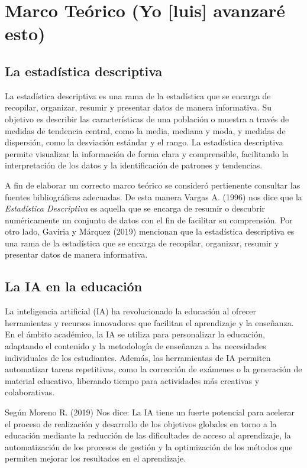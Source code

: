 \section{Marco Teórico (Yo [luis] avanzaré esto)}

  \subsection{La estadística descriptiva}

  La estadística descriptiva es una rama de la estadística que se encarga de recopilar, organizar, resumir y presentar datos de manera informativa. Su objetivo es describir las características de una población o muestra a través de medidas de tendencia central, como la media, mediana y moda, y medidas de dispersión, como la desviación estándar y el rango. La estadística descriptiva permite visualizar la información de forma clara y comprensible, facilitando la interpretación de los datos y la identificación de patrones y tendencias.

  A fin de elaborar un correcto marco teórico se consideró pertienente consultar las fuentes bibliográficas adecuadas. De esta manera Vargas A. (1996) nos dice que la \textit{Estadística Descriptiva} es aquella que se encarga de resumir o descubrir numéricamente un conjunto de datos con el fin de facilitar su comprensión. Por otro lado, Gaviria y Márquez (2019) mencionan que la estadística descriptiva es una rama de la estadística que se encarga de recopilar, organizar, resumir y presentar datos de manera informativa.

  \subsection{La IA en la educación}

  La inteligencia artificial (IA) ha revolucionado la educación al ofrecer herramientas y recursos innovadores que facilitan el aprendizaje y la enseñanza. En el ámbito académico, la IA se utiliza para personalizar la educación, adaptando el contenido y la metodología de enseñanza a las necesidades individuales de los estudiantes. Además, las herramientas de IA permiten automatizar tareas repetitivas, como la corrección de exámenes o la generación de material educativo, liberando tiempo para actividades más creativas y colaborativas.

  Según Moreno R. (2019) Nos dice: La IA tiene un fuerte potencial para acelerar el proceso de realización y desarrollo de los objetivos globales en torno a la educación mediante la reducción de las dificultades de acceso al aprendizaje, la automatización de los procesos de gestión y la optimización de los métodos que permiten mejorar los resultados en el aprendizaje.

